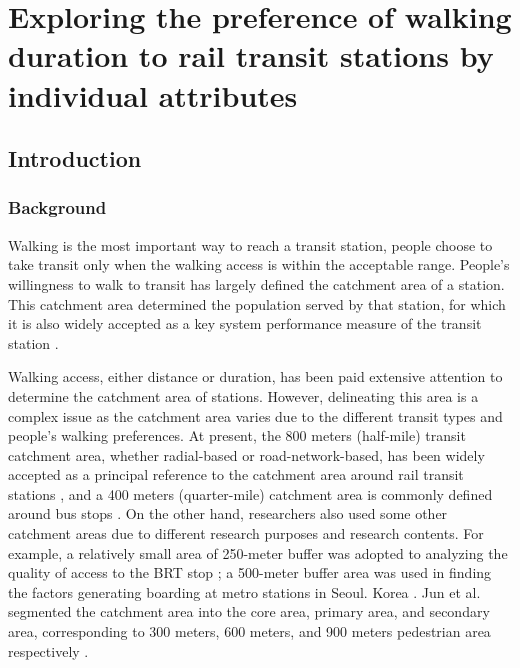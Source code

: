 \chapter{Exploring the preference of walking duration to rail transit stations by individual attributes}

\section{Introduction}



\subsection{Background}
Walking is the most important way to reach a transit station, people choose to take transit only when the walking access is within the acceptable range. People’s willingness to walk to transit has largely defined the catchment area of a station. This catchment area determined the population served by that station, for which it is also widely accepted as a key system performance measure of the transit station \cite{fielding1978performance,el2014new,chia2016walking}. 

Walking access, either distance or duration, has been paid extensive attention to determine the catchment area of stations. However, delineating this area is a complex issue as the catchment area varies due to the different transit types and people's walking preferences. At present, the 800 meters (half-mile) transit catchment area, whether radial-based or road-network-based, has been widely accepted as a principal reference to the catchment area around rail transit stations \cite{kuby2004factors,gutierrez2011transit,cardozo2012application,zhao2013influences}, and a 400 meters (quarter-mile) catchment area is commonly defined around bus stops \cite{o1992analysis,zhao2003forecasting}. On the other hand, researchers also used some other catchment areas due to different research purposes and research contents. For example, a relatively small area of 250-meter buffer was adopted to analyzing the quality of access to the BRT stop
\cite{estupinan2008relationship}; a 500-meter buffer area was used in finding the factors generating boarding at metro stations in Seoul. Korea \cite{sohn2010factors}. Jun et al. segmented the catchment area into the core area, primary area, and secondary area, corresponding to 300 meters, 600 meters, and 900 meters pedestrian area respectively \cite{jun2015land}.

